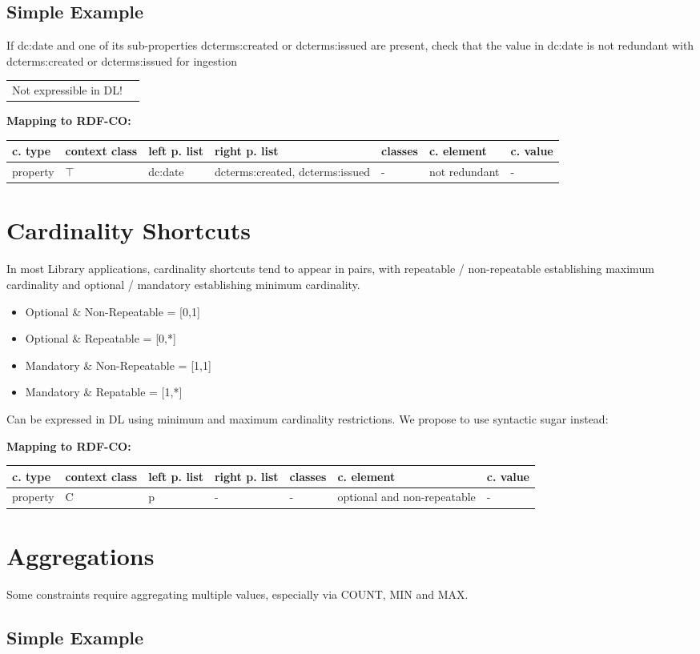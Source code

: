 \documentclass{llncs}
\newenvironment{gcotable}{
  \scriptsize
  \sffamily
  \vspace{0cm}
	\begin{center}
	\textbf{\vspace{0.4cm}Mapping to RDF-CO:} \\
  \begin{tabular}{l|l|l|l|l|l|l}
	\hline
  \textbf{c. type} & \textbf{context class} & \textbf{left p. list} & \textbf{right p. list} & \textbf{classes} & \textbf{c. element} & \textbf{c. value} \\
  \hline

}{
  \hline
  \end{tabular}
	\end{center}
}
\newenvironment{DL}{
  \vspace{0cm}
	\begin{center}
  \begin{tabular}{r l}

}{
  \end{tabular}
	\end{center}
}
\begin{document}
\subsection{Simple Example}

If dc:date and one of its sub-properties dcterms:created or dcterms:issued are present, check that the value in dc:date is not redundant with dcterms:created or dcterms:issued for ingestion

\begin{DL}
Not expressible in DL!
\end{DL}

\begin{gcotable}
property & $\top$ & dc:date & dcterms:created, dcterms:issued & - & not redundant & - \\
\end{gcotable}

\section{Cardinality Shortcuts}

In most Library applications, cardinality shortcuts tend to appear in pairs, with repeatable / non-repeatable establishing maximum cardinality and optional / mandatory establishing minimum cardinality.
\begin{itemize}
	\item Optional \& Non-Repeatable = [0,1]
  \item Optional \& Repeatable = [0,*]
  \item Mandatory \& Non-Repeatable = [1,1]
  \item Mandatory \& Repatable = [1,*]
\end{itemize}
Can be expressed in DL using minimum and maximum cardinality restrictions.
We propose to use syntactic sugar instead:
\begin{gcotable}
property & C & p & - & - & optional and non-repeatable & - \\
\end{gcotable}

\section{Aggregations}

Some constraints require aggregating multiple values, especially via COUNT, MIN and MAX. 

\subsection{Simple Example}
\end{document}
